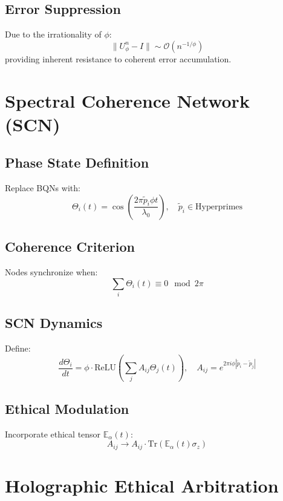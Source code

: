 \documentclass[11pt]{article}
\begin{document}
\subsection{Error Suppression}
Due to the irrationality of $\phi$:
\begin{equation}
\| U_\phi^n - I \| \sim \mathcal{O}(n^{-1/\phi})
\end{equation}
providing inherent resistance to coherent error accumulation.

\section{Spectral Coherence Network (SCN)}

\subsection{Phase State Definition}
Replace BQNs with:
\begin{equation}
\Theta_i(t) = \cos\left( \frac{2\pi \tilde{p}_i \phi t}{\lambda_0} \right), \quad \tilde{p}_i \in \text{Hyperprimes}
\end{equation}

\subsection{Coherence Criterion}
Nodes synchronize when:
\begin{equation}
\sum_i \Theta_i(t) \equiv 0 \mod 2\pi
\end{equation}

\subsection{SCN Dynamics}
Define:
\begin{equation}
\frac{d\Theta_i}{dt} = \phi \cdot \text{ReLU}\left( \sum_j A_{ij} \Theta_j(t) \right), \quad A_{ij} = e^{2\pi i \phi |\tilde{p}_i - \tilde{p}_j|}
\end{equation}

\subsection{Ethical Modulation}
Incorporate ethical tensor $\mathbb{E}_\alpha(t)$:
\begin{equation}
A_{ij} \rightarrow A_{ij} \cdot \text{Tr}(\mathbb{E}_\alpha(t) \sigma_z)
\end{equation}

\section{Holographic Ethical Arbitration}
\end{document}
